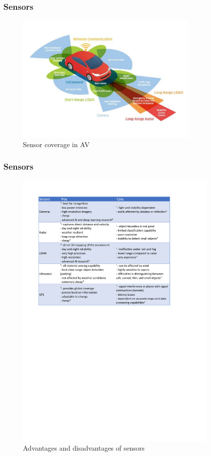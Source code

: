 \documentclass[xcolor=dvipsnames]{beamer}
\begin{document}
\begin{frame}[fragile=singleslide]\frametitle{\bf{Sensors}}
\centering
    \begin{figure}
    \centering
    \vspace*{-.1cm}
    \caption{Sensor coverage in AV\footnotemark}
    \vspace*{-.3cm} 
    \includegraphics[width=9cm]{SensorsScheme.pdf}
    \end{figure}
\end{frame}


\begin{frame}[fragile=singleslide]\frametitle{\bf{Sensors}}
\centering
    \begin{figure}
    \centering
    \caption{Advantages and disadvantages of sensors}
    \vspace*{-1.3cm}
    \hspace*{0.65cm}
    \includegraphics[width=10cm]{tabulka.pdf}
    \end{figure}
\end{frame}
\end{document}
